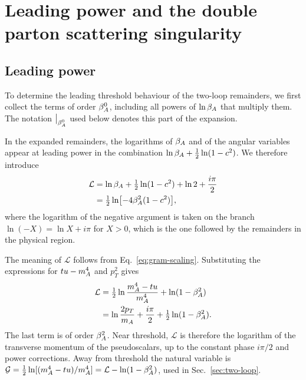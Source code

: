\section{Leading power and the double parton scattering singularity}
\label{sec:physics}

\subsection{Leading power}
\label{sec:leading}

To determine the leading threshold behaviour of the
two-loop remainders, we first collect the terms of
order $\beta_A^0$, including all powers of $\ln\beta_A$
that multiply them. The notation $\big|_{\beta_A^0}$ used below
denotes this part of the expansion.

In the expanded remainders, the logarithms of $\beta_A$ and of the angular
variables appear at leading power in the combination
$\ln\beta_A+\tfrac12\ln(1-c^2)$. We therefore introduce
\begin{align}
 \mathcal L
 &=\ln\beta_A+\tfrac12\ln(1-c^2)+\ln2+\frac{i\pi}{2}
 \nonumber\\
 &=\tfrac12\ln\bigl[-4\beta_A^2(1-c^2)\bigr],
 \label{eq:calL}
\end{align}
where the logarithm of the negative argument is taken on the branch
$\ln(-X)=\ln X+i\pi$ for $X>0$, which is the one followed by the remainders
in the physical region.

The meaning of $\mathcal L$ follows from Eq.~\eqref{eq:gram-scaling}.
Substituting the expressions for $tu-m_A^4$ and $p_T^2$ gives
\begin{align}
 \nonumber
 \mathcal L
 &=\tfrac12\ln\frac{m_A^4-tu}{m_A^4}
   +\ln(1-\beta_A^2)
 \\
 &=\ln\frac{2p_T}{m_A}+\frac{i\pi}{2}
   +\tfrac12\ln(1-\beta_A^2).
 \label{eq:calL-pT}
\end{align}
The last term is of order $\beta_A^2$. Near threshold, $\mathcal L$ is therefore
the logarithm of the transverse momentum of the pseudoscalars, up to the
constant phase $i\pi/2$ and power corrections. Away from threshold the
natural variable is $\mathcal G=\tfrac12\ln[(m_A^4-tu)/m_A^4]=\mathcal L-\ln(1-\beta_A^2)$,
used in Sec.~\ref{sec:two-loop}.

